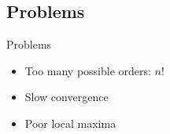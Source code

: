 \subsection{Problems}
	\begin{frame}
		\begin{block}{Problems}
			\begin{itemize}
				\item Too many possible orders: $n!$
				\item Slow convergence
				\item Poor local maxima
			\end{itemize}
		\end{block}
	\end{frame}